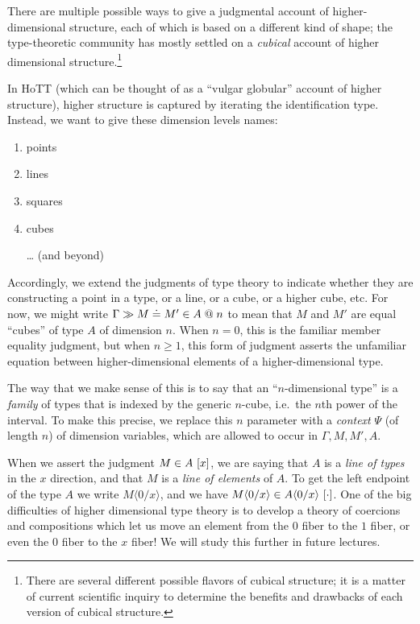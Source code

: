 \documentclass{article}
\newcommand\DimSubst[3]{#3\langle{#1}/{#2}\rangle}
\begin{document}
There are multiple possible ways to give a judgmental account of
higher-dimensional structure, each of which is based on a different
kind of shape; the type-theoretic community has mostly settled on a
\emph{cubical} account of higher dimensional structure.\footnote{There
  are several different possible flavors of cubical structure; it is a
  matter of current scientific inquiry to determine the benefits and
  drawbacks of each version of cubical structure.}

In HoTT (which can be thought of as a ``vulgar globular'' account of
higher structure), higher structure is captured by iterating the
identification type. Instead, we want to give these dimension levels
names:

\begin{enumerate}
\item points
\item lines
\item squares
\item cubes
\item[\ldots] (and beyond)
\end{enumerate}

Accordingly, we extend the judgments of type theory to indicate
whether they are constructing a point in a type, or a line, or a cube,
or a higher cube, etc. For now, we might write
$\hasEEC{\Gamma}{M}{M'}{A}\mathrel{@}n$ to mean that $M$ and $M'$ are
equal ``cubes'' of type $A$ of dimension $n$. When $n=0$, this is the
familiar member equality judgment, but when $n\geq 1$, this form of
judgment asserts the unfamiliar equation between higher-dimensional
elements of a higher-dimensional type.

The way that we make sense of this is to say that an ``$n$-dimensional
type'' is a \emph{family} of types that is indexed by the generic
$n$-cube, i.e.\ the $n$th power of the interval. To make this precise,
we replace this $n$ parameter with a \emph{context} $\Psi$ (of length
$n$) of dimension variables, which are allowed to occur in
$\Gamma,M,M',A$.

When we assert the judgment $\hasEC{M}{A}\ [x]$, we are saying that
$A$ is a \emph{line of types} in the $x$ direction, and that $M$ is a
\emph{line of elements} of $A$. To get the left endpoint of the type
$A$ we write $\DimSubst{0}{x}{M}$, and we have
$\hasEC{\DimSubst{0}{x}{M}}{\DimSubst{0}{x}{A}}\ [\cdot]$. One of the
big difficulties of higher dimensional type theory is to develop a
theory of coercions and compositions which let us move an element from
the $0$ fiber to the $1$ fiber, or even the $0$ fiber to the $x$
fiber! We will study this further in future lectures.
\end{document}
